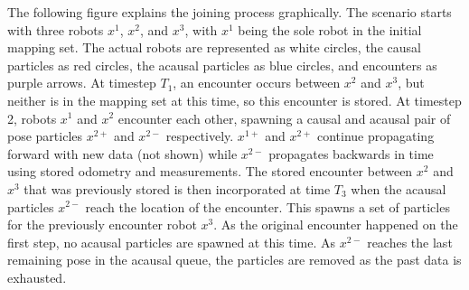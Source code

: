 The following figure explains the joining process graphically. The scenario starts with three robots $x^1$, $x^2$, and $x^3$, with $x^1$ being the sole robot in the initial mapping set. The actual robots are represented as white circles, the causal particles as red circles, the acausal particles as blue circles, and encounters as purple arrows. At timestep $T_1$, an encounter occurs between $x^2$ and $x^3$, but neither is in the mapping set at this time, so this encounter is stored. At timestep 2, robots $x^1$ and $x^2$ encounter each other, spawning a causal and acausal pair of pose particles $x^{2+}$ and $x^{2-}$ respectively. $x^{1+}$ and $x^{2+}$ continue propagating forward with new data (not shown) while $x^{2-}$ propagates backwards in time using stored odometry and measurements. The stored encounter between $x^2$ and $x^3$ that was previously stored is then incorporated at time $T_3$ when the acausal particles $x^{2-}$ reach the location of the encounter. This spawns a set of particles for the previously encounter robot $x^3$. As the original encounter happened on the first step, no acausal particles are spawned at this time. As $x^{2-}$ reaches the last remaining pose in the acausal queue, the particles are removed as the past data is exhausted.

